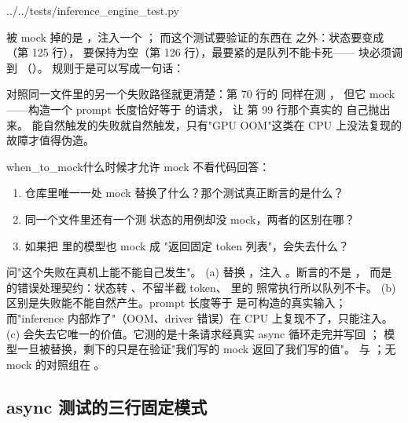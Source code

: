 %
  {../../tests/inference_engine_test.py}

被 mock 掉的是 ，注入一个 ；
而这个测试要验证的东西在  之外：状态要变成 （第 125 行），
 要保持为空（第 126 行），最要紧的是队列不能卡死——
 块必须调到 （）。
规则于是可以写成一句话：

对照同一文件里的另一个失败路径就更清楚：第 70 行的
 同样在测 ，
但它 mock——构造一个 prompt 长度恰好等于  的请求，
让  第 99 行那个真实的  自己抛出来。
能自然触发的失败就自然触发，只有"GPU OOM"这类在 CPU 上没法复现的故障才值得伪造。

\begin{checkpoint}{when_to_mock}{什么时候才允许 mock}
不看代码回答：
\begin{enumerate}[label=(\alph*)]
  \item 仓库里唯一一处 mock 替换了什么？那个测试真正断言的是什么？
  \item 同一个文件里还有一个测  状态的用例却没 mock，两者的区别在哪？
  \item 如果把  里的模型也 mock 成
        "返回固定 token 列表"，会失去什么？
\end{enumerate}
\hint 问"这个失败在真机上能不能自己发生"。
\ifshowanswers
\tcblower
\answer (a) 替换 ，注入 。断言的不是 ，
而是  的错误处理契约：状态转 、不留半截 token、
 里的  照常执行所以队列不卡。
(b) 区别是失败能不能自然产生。prompt 长度等于  是可构造的真实输入；
而"inference 内部炸了"（OOM、driver 错误）在 CPU 上复现不了，只能注入。
(c) 会失去它唯一的价值。它测的是十条请求经真实 async 循环走完并写回 ；
模型一旦被替换，剩下的只是在验证"我们写的 mock 返回了我们写的值"。
\whereincode {} 与
；无 mock 的对照组在
。
\fi
\end{checkpoint}

\subsection{async 测试的三行固定模式}
\label{sec:test-async}

